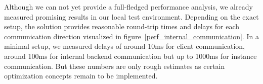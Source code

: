 \documentclass[runningheads]{llncs}
\begin{document}
Although we can not yet provide a full-fledged performance analysis,
we already measured promising results in our local test environment.
Depending on the exact setup,
the solution provides
reasonable round-trip times and delays for each communication direction
visualized in figure~\ref{perf_internal_communication}.
In a minimal setup, we measured delays of around 10ms for client communication,
around 100ms for internal backend communication
but up to 1000ms for instance communication.
But these numbers are only rough estimates
as certain optimization concepts remain to be implemented.
\end{document}
